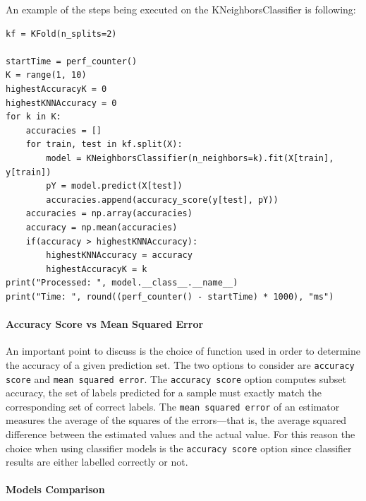 An example of the steps being executed on the KNeighborsClassifier is following:
\begin{lstlisting}[caption=KNeighborsClassifier Example]
kf = KFold(n_splits=2)

startTime = perf_counter()
K = range(1, 10)
highestAccuracyK = 0
highestKNNAccuracy = 0
for k in K:
    accuracies = []
    for train, test in kf.split(X):
        model = KNeighborsClassifier(n_neighbors=k).fit(X[train], y[train])
        pY = model.predict(X[test])
        accuracies.append(accuracy_score(y[test], pY))
    accuracies = np.array(accuracies)
    accuracy = np.mean(accuracies)
    if(accuracy > highestKNNAccuracy):
        highestKNNAccuracy = accuracy
        highestAccuracyK = k
print("Processed: ", model.__class__.__name__)
print("Time: ", round((perf_counter() - startTime) * 1000), "ms")
\end{lstlisting}

\paragraph{Accuracy Score vs Mean Squared Error}

An important point to discuss is the choice of function used in order to determine the accuracy of a given prediction set. The two options to consider are \verb|accuracy score| and \verb|mean squared error|. The \verb|accuracy score| option computes subset accuracy, the set of labels predicted for a sample must exactly match the corresponding set of correct labels. The \verb|mean squared error| of an estimator measures the average of the squares of the errors—that is, the average squared difference between the estimated values and the actual value. For this reason the choice when using classifier models is the \verb|accuracy score| option since classifier results are either labelled correctly or not.

\paragraph{Models Comparison}

